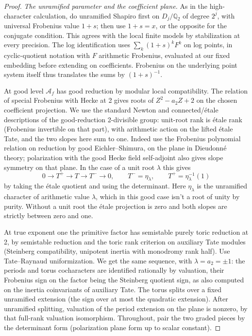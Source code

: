 \begin{proof}
\emph{The unramified parameter and the coefficient plane.}
As in the high-character calculation, do unramified Shapiro first on \(D_j/\mathbb Q_2\) of degree \(2^j\), with universal Frobenius value \(1+s\); then use \(1+s=x\), or the opposite for the conjugate condition. This agrees with the local finite models by stabilization at every precision. The log identification uses \(\sum_k(1+s)^k F^k\) on log points, in cyclic-quotient notation with \(F\) arithmetic Frobenius, evaluated at our fixed embedding before extending on coefficients. Frobenius on the underlying point system itself thus translates the sums by \((1+s)^{-1}\).

At good level \(\mathcal A_f\) has good reduction by modular local compatibility. The relation of special Frobenius with Hecke at 2 gives roots of \(Z^2-a_2 Z+2\) on the chosen coefficient projection. We use the standard Newton and connected/étale descriptions of the good-reduction 2-divisible group: unit-root rank is étale rank (Frobenius invertible on that part), with arithmetic action on the lifted étale Tate, and the two slopes here sum to one. Indeed use the Frobenius polynomial relation on reduction by good Eichler--Shimura, on the plane in Dieudonné theory; polarization with the good Hecke field self-adjoint also gives slope symmetry on that plane. In the case of a unit root \(\lambda\) this gives
\[
     0\to T^+\to T\to T^-\to0,\qquad
              T^-=\eta_\lambda,\qquad T^+=\eta_\lambda^{-1}(1)
\]
by taking the étale quotient and using the determinant. Here \(\eta_\lambda\) is the unramified character of arithmetic value \(\lambda\), which in this good case isn't a root of unity by purity. Without a unit root the étale projection is zero and both slopes are strictly between zero and one.

At true exponent one the primitive factor has semistable purely toric reduction at 2, by semistable reduction and the toric rank criterion on auxiliary Tate modules (Steinberg compatibility, unipotent inertia with monodromy rank half). Use Tate--Raynaud uniformization. We get the same sequence, with \(\lambda=a_2=\pm1\): the periods and torus cocharacters are identified rationally by valuation, their Frobenius sign on the factor being the Steinberg quotient sign, as also computed on the inertia coinvariants of auxiliary Tate. The torus splits over a fixed unramified extension (the sign over at most the quadratic extension). After unramified splitting, valuation of the period extension on the plane is nonzero, by that full-rank valuation isomorphism. Throughout, pair the two graded pieces by the determinant form (polarization plane form up to scalar constant).


\end{proof}
